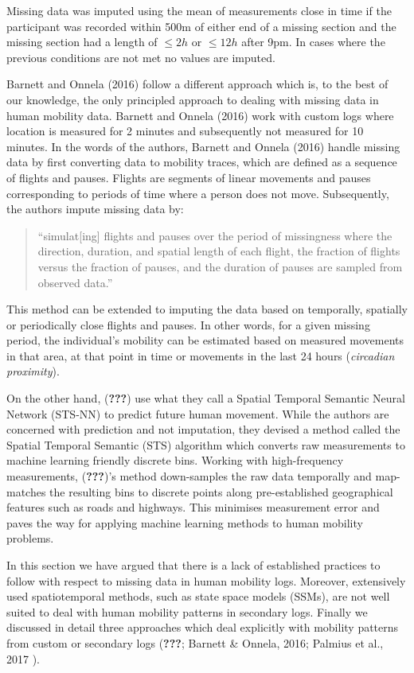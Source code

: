 \documentclass[man]{apa6}
\theoremstyle{definition}
\theoremstyle{definition}
\theoremstyle{definition}
\theoremstyle{remark}
\begin{document}
Missing data was imputed using the mean of measurements close in time if
the participant was recorded within 500m of either end of a missing
section and the missing section had a length of \(\leq 2h\) or
\(\leq 12h\) after 9pm. In cases where the previous conditions are not
met no values are imputed.

Barnett and Onnela (2016) follow a different approach which is, to the
best of our knowledge, the only principled approach to dealing with
missing data in human mobility data. Barnett and Onnela (2016) work with
custom logs where location is measured for 2 minutes and subsequently
not measured for 10 minutes. In the words of the authors, Barnett and
Onnela (2016) handle missing data by first converting data to mobility
traces, which are defined as a sequence of flights and pauses. Flights
are segments of linear movements and pauses corresponding to periods of
time where a person does not move. Subsequently, the authors impute
missing data by:

\begin{quote}
\enquote{simulat{[}ing{]} flights and pauses over the period of
missingness where the direction, duration, and spatial length of each
flight, the fraction of flights versus the fraction of pauses, and the
duration of pauses are sampled from observed data.}
\end{quote}

This method can be extended to imputing the data based on temporally,
spatially or periodically close flights and pauses. In other words, for
a given missing period, the individual's mobility can be estimated based
on measured movements in that area, at that point in time or movements
in the last 24 hours (\emph{circadian proximity}).

On the other hand, ({\textbf{???}}) use what they call a Spatial
Temporal Semantic Neural Network (STS-NN) to predict future human
movement. While the authors are concerned with prediction and not
imputation, they devised a method called the Spatial Temporal Semantic
(STS) algorithm which converts raw measurements to machine learning
friendly discrete bins. Working with high-frequency measurements,
({\textbf{???}})'s method down-samples the raw data temporally and
map-matches the resulting bins to discrete points along pre-established
geographical features such as roads and highways. This minimises
measurement error and paves the way for applying machine learning
methods to human mobility problems.

In this section we have argued that there is a lack of established
practices to follow with respect to missing data in human mobility logs.
Moreover, extensively used spatiotemporal methods, such as state space
models (SSMs), are not well suited to deal with human mobility patterns
in secondary logs. Finally we discussed in detail three approaches which
deal explicitly with mobility patterns from custom or secondary logs
({\textbf{???}}; Barnett \& Onnela, 2016; Palmius et al., 2017 ).
\end{document}
